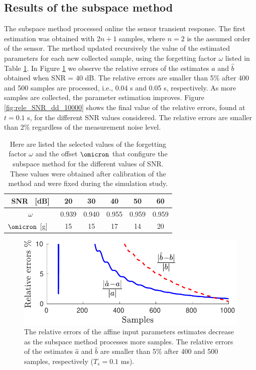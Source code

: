 \subsection{Results of the subspace method}

The subspace method processed online the sensor transient response.
The first estimation was obtained with $2n+1$ samples, where $n=2$ is the assumed order of the sensor.
The method updated recursively the value of the estimated parameters for each new collected sample, using the forgetting factor $\omega$ listed in Table \ref{table:lambdas}.
In Figure \ref{fig:rele_dd_40dB_s1} we observe the relative errors of the estimates $\widehat{a}$ and $\widehat{b}$ obtained when SNR = 40 dB. 
The relative errors are smaller than 5\% after 400 and 500 samples are processed, i.e., 0.04 s and 0.05 s, respectively.
As more samples are collected, the parameter estimation improves.
Figure \ref{fig:rele_SNR_dd_10000} shows the final value of the relative errors, found at $t=0.1$ s, for the different SNR values considered.
The relative errors are smaller than 2\% regardless of the measurement noise level.

\begin{table}[h!]
\centering
\caption{Here are listed the selected values of the forgetting factor $\omega$ and the offset $\omicron$ that configure the subspace method for the different values of SNR. These values were obtained after calibration of the method and were fixed during the simulation study.}
\begin{tabular}{c| c c c c c} 
 \hline
 SNR \ [dB] & 20 & 30 & 40 & 50 & 60 \\ [0.5ex] 
 \hline
 $\omega$ & 0.939 & 0.940 & 0.955 & 0.959 & 0.959 \\ %
 $\omicron$ [g] \  & 15 & 15 & 17 & 14 & 20 \\ [0.5ex] %
 \hline
\end{tabular}
\label{table:lambdas}
\end{table}


\begin{figure}[!htbp]
\centering
\includegraphics[width=0.69\columnwidth]{./ChapterRampInput/fig/Fig_3.pdf} 
\caption{ \label{fig:rele_dd_40dB_s1} The relative errors of the affine input parameters estimates decrease as the subspace method processes more samples. The relative errors of the estimates $\widehat{a}$ and $\widehat{b}$ are smaller than 5\% after 400 and 500 samples, respectively ($T_s = 0.1$ ms). }
\end{figure}



